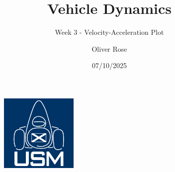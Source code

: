 \documentclass{beamer}
\title{Vehicle Dynamics}
\subtitle{Week 3 - Velocity-Acceleration Plot}
\author{Oliver Rose}
\institute{University of Strathclyde Motorsport}
\date{07/10/2025}
\begin{document}
\begin{frame}
    \maketitle
\end{frame}



\begin{frame}[focus]
    \begin{figure}
        \includegraphics[width=0.33\textwidth]{../../res/usm-logo.png}
    \end{figure}
\end{frame}
\end{document}
